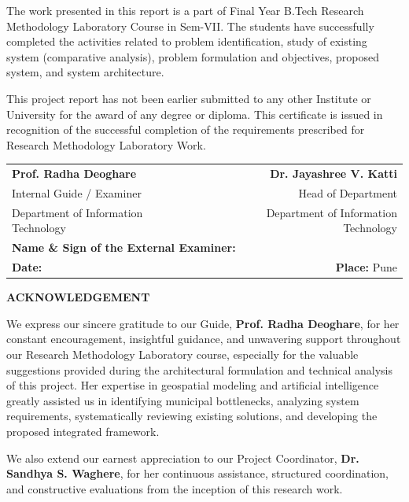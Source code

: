 \documentclass[12pt,a4paper]{report}
\begin{document}
\noindent The work presented in this report is a part of Final Year B.Tech Research Methodology Laboratory Course in Sem-VII. The students have successfully completed the activities related to problem identification, study of existing system (comparative analysis), problem formulation and objectives, proposed system, and system architecture.

\noindent This project report has not been earlier submitted to any other Institute or University for the award of any degree or diploma. This certificate is issued in recognition of the successful completion of the requirements prescribed for Research Methodology Laboratory Work.

\vspace{2.0cm}

\noindent
\begin{tabularx}{\textwidth}{X r}
\textbf{Prof. Radha Deoghare} & \textbf{Dr. Jayashree V. Katti} \\
Internal Guide / Examiner & Head of Department \\
Department of Information Technology & Department of Information Technology \\[1.8cm]
\multicolumn{2}{l}{\textbf{Name \& Sign of the External Examiner:}} \\[0.8cm]
\textbf{Date:} & \textbf{Place:} Pune
\end{tabularx}

\newpage
\thispagestyle{empty}
\begin{center}
    {\fontsize{16pt}{20pt}\selectfont \textbf{ACKNOWLEDGEMENT}}\\[0.8cm]
\end{center}

\noindent We express our sincere gratitude to our Guide, \textbf{Prof. Radha Deoghare}, for her constant encouragement, insightful guidance, and unwavering support throughout our Research Methodology Laboratory course, especially for the valuable suggestions provided during the architectural formulation and technical analysis of this project. Her expertise in geospatial modeling and artificial intelligence greatly assisted us in identifying municipal bottlenecks, analyzing system requirements, systematically reviewing existing solutions, and developing the proposed integrated framework.

\noindent We also extend our earnest appreciation to our Project Coordinator, \textbf{Dr. Sandhya S. Waghere}, for her continuous assistance, structured coordination, and constructive evaluations from the inception of this research work.
\end{document}

